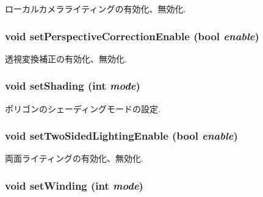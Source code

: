 ローカルカメラライティングの有効化、無効化. \hypertarget{classm3g_1_1PolygonMode_81003e409298c3247ab2fed98a7270e9}{
\subsubsection[{setPerspectiveCorrectionEnable}]{\setlength{\rightskip}{0pt plus 5cm}void setPerspectiveCorrectionEnable (bool {\em enable})}}
\label{classm3g_1_1PolygonMode_81003e409298c3247ab2fed98a7270e9}


透視変換補正の有効化、無効化. \hypertarget{classm3g_1_1PolygonMode_ebd2bc289af0e5cbee5ea29cbc55ba5a}{
\subsubsection[{setShading}]{\setlength{\rightskip}{0pt plus 5cm}void setShading (int {\em mode})}}
\label{classm3g_1_1PolygonMode_ebd2bc289af0e5cbee5ea29cbc55ba5a}


ポリゴンのシェーディングモードの設定. \hypertarget{classm3g_1_1PolygonMode_8687b0d3016a777d32e7ebfa1ffd45aa}{
\subsubsection[{setTwoSidedLightingEnable}]{\setlength{\rightskip}{0pt plus 5cm}void setTwoSidedLightingEnable (bool {\em enable})}}
\label{classm3g_1_1PolygonMode_8687b0d3016a777d32e7ebfa1ffd45aa}


両面ライティングの有効化、無効化. \hypertarget{classm3g_1_1PolygonMode_5535581a651835a0da246b5936c2f0b5}{
\subsubsection[{setWinding}]{\setlength{\rightskip}{0pt plus 5cm}void setWinding (int {\em mode})}}
\label{classm3g_1_1PolygonMode_5535581a651835a0da246b5936c2f0b5}


